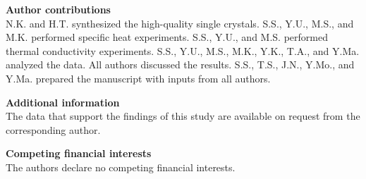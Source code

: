 \documentclass[twocolumn,preprintnumbers,prl,superscriptaddress,amsmath,amssymb,amsfonts]{revtex4}
\begin{document}
\noindent
{\bf Author contributions}\\
N.K. and H.T. synthesized the high-quality single crystals. S.S., Y.U., M.S., and M.K. performed specific heat experiments. S.S., Y.U., and M.S. performed thermal conductivity experiments. S.S., Y.U., M.S., M.K., Y.K., T.A., and Y.Ma. analyzed the data. All authors discussed the results. S.S., T.S., J.N., Y.Mo., and Y.Ma. prepared the manuscript with inputs from all authors.

\noindent
{\bf Additional information}\\
The data that support the findings of this study are available on request from the corresponding author.

\noindent
{\bf Competing financial interests}\\
The authors declare no competing financial interests.
\end{document}
